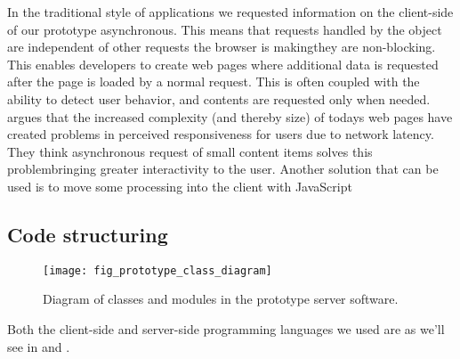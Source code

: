 In the traditional style of  applications we requested information
on the client-side of our prototype asynchronous.%
This means that requests handled by the  object
are independent of other requests the browser is making\dash{}they
are non-blocking. This enables developers to create web pages where additional
data is requested after the page is loaded by a normal  request.
This is often coupled with the ability to detect user behavior, and contents
are requested only when needed. \citet[pp.281--282]{stamey06} argues that
the increased complexity (and thereby size) of todays web pages have created
problems in perceived responsiveness for users due to network latency. They
think asynchronous request of small content items solves this
problem\dash{}bringing greater interactivity to the user. Another solution
that can be used is to move some processing into the client with
JavaScript \citep[]{jazayeri07}

\subsection{Code structuring}
\label{section:implementation.architecture.code.structuring}

\begin{figure}
  \begin{whole}
    \texttt{[image: fig\_prototype\_class\_diagram]}
    \caption[Prototype Class Diagram]{
      Diagram of classes and modules in the prototype server software.
    }
    \label{figure:fig.prototype.class.diagram}
  \end{whole}
\end{figure}

Both the client-side and server-side programming languages we used
are as we'll see in
 and
 .%

